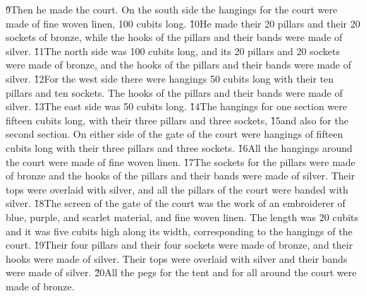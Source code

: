 \v{9}Then he made the court. On the south side the hangings for the court were made of fine woven linen, 100 cubits long. \v{10}He made their 20 pillars and their 20 sockets of bronze, while the hooks of the pillars and their bands were made of silver. \v{11}The north side was 100 cubits long, and its 20 pillars and 20 sockets were made of bronze, and the hooks of the pillars and their bands were made of silver. \v{12}For the west side there were hangings 50 cubits long with their ten pillars and ten sockets. The hooks of the pillars and their bands were made of silver. \v{13}The east side was 50 cubits long. \v{14}The hangings for one section were fifteen cubits long, with their three pillars and three sockets, \v{15}and also for the second section. On either side of the gate of the court were hangings of fifteen cubits long with their three pillars and three sockets. \v{16}All the hangings around the court were made of fine woven linen. \v{17}The sockets for the pillars were made of bronze and the hooks of the pillars and their bands were made of silver. Their tops were overlaid with silver, and all the pillars of the court were banded with silver. \v{18}The screen of the gate of the court was the work of an embroiderer of blue, purple, and scarlet material, and fine woven linen. The length was 20 cubits and it was five cubits high along its width, corresponding to the hangings of the court. \v{19}Their four pillars and their four sockets were made of bronze, and their hooks were made of silver. Their tops were overlaid with silver and their bands were made of silver. \v{20}All the pegs for the tent and for all around the court were made of bronze.

